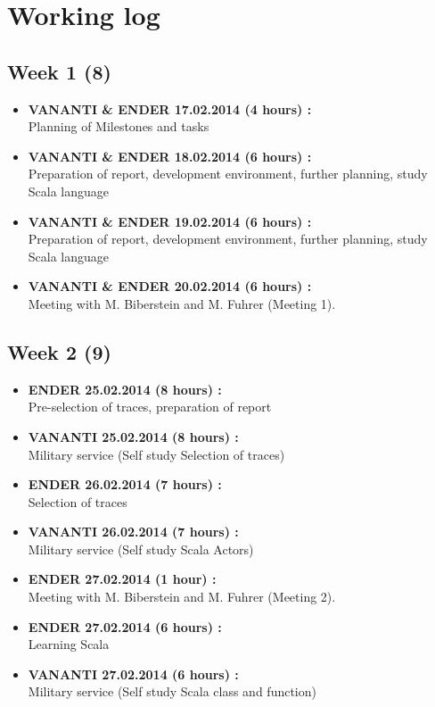 \documentclass[
	a4paper,					10pt,							twoside,					openright,				notitlepage,			parskip=half,			]{scrreprt}
\begin{document}
\chapter{Working log}

\label{chap:worklog}
\section*{Week 1 (8)}
\label{sec:worklog_01}
\begin{itemize}
\item{\textbf{VANANTI \& ENDER 17.02.2014 (4 hours) :} \\  Planning of Milestones and tasks }
\item{\textbf{VANANTI \& ENDER 18.02.2014 (6 hours) :} \\  Preparation of report, development environment, further planning, study Scala language}
\item{\textbf{VANANTI \& ENDER 19.02.2014 (6 hours) :} \\  Preparation of report, development environment, further planning, study Scala language}
\item{\textbf{VANANTI \& ENDER 20.02.2014 (6 hours) :} \\  Meeting with M. Biberstein and M. Fuhrer (Meeting 1).}
\end{itemize}
\section*{Week 2 (9)}
\label{sec:worklog_02}
\begin{itemize}
\item{\textbf{ENDER 25.02.2014 (8 hours) :} \\  Pre-selection of traces, preparation of report }
\item{\textbf{VANANTI 25.02.2014 (8 hours) :} \\  Military service (Self study Selection of traces)}
\item{\textbf{ENDER 26.02.2014 (7 hours) :} \\  Selection of traces}
\item{\textbf{VANANTI 26.02.2014 (7 hours) :} \\  Military service (Self study Scala Actors)}
\item{\textbf{ENDER 27.02.2014 (1 hour) :} \\  Meeting with M. Biberstein and M. Fuhrer (Meeting 2).}
\item{\textbf{ENDER 27.02.2014 (6 hours) :} \\  Learning Scala}
\item{\textbf{VANANTI 27.02.2014 (6 hours) :} \\  Military service (Self study Scala class and function)}
\end{itemize}
\end{document}
